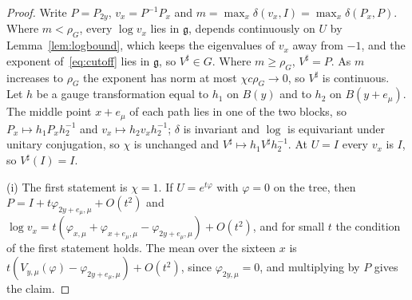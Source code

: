 \documentclass[11pt]{amsart}
\theoremstyle{definition}
\theoremstyle{remark}
\numberwithin{equation}{section}
\begin{document}
\begin{proof}
Write $P=P_{2y}$, $v_x=P^{-1}P_x$ and $m=\max_x\delta(v_x,I)=\max_x\delta(P_x
,P)$. Where $m<\rho_G$, every $\log v_x$ lies in $\mathfrak g$, depends
continuously on $U$ by Lemma~\ref{lem:logbound}, which keeps the eigenvalues
of $v_x$ away from $-1$, and the exponent of~\eqref{eq:cutoff} lies in
$\mathfrak g$, so $V^\sharp\in G$. Where $m\ge\rho_G$, $V^\sharp=P$. As $m$
increases to $\rho_G$ the exponent has norm at most $\chi c\rho_G\to0$, so
$V^\sharp$ is continuous. Let $h$ be a gauge transformation equal to $h_1$
on $B(y)$ and to $h_2$ on $B(y+e_\mu)$. The middle point $x+e_\mu$ of each
path lies in one of the two blocks, so $P_x\mapsto h_1P_xh_2^{-1}$ and
$v_x\mapsto h_2v_xh_2^{-1}$; $\delta$ is invariant and $\log$ is equivariant
under unitary conjugation, so $\chi$ is unchanged and $V^\sharp\mapsto h_1
V^\sharp h_2^{-1}$. At $U=I$ every $v_x$ is $I$, so $V^\sharp(I)=I$.

(i) The first statement is $\chi=1$. If $U=e^{t\varphi}$ with $\varphi=0$ on
the tree, then $P=I+t\varphi_{2y+e_\mu,\mu}+O(t^2)$ and
$\log v_x=t(\varphi_{x,\mu}+\varphi_{x+e_\mu,\mu}-\varphi_{2y+e_\mu,\mu})+
O(t^2)$, and for small $t$ the condition of the first statement holds. The
mean over the sixteen $x$ is $t(V_{y,\mu}(\varphi)-\varphi_{2y+e_\mu,\mu})
+O(t^2)$, since $\varphi_{2y,\mu}=0$, and multiplying by $P$ gives the
claim.


\end{proof}
\end{document}

